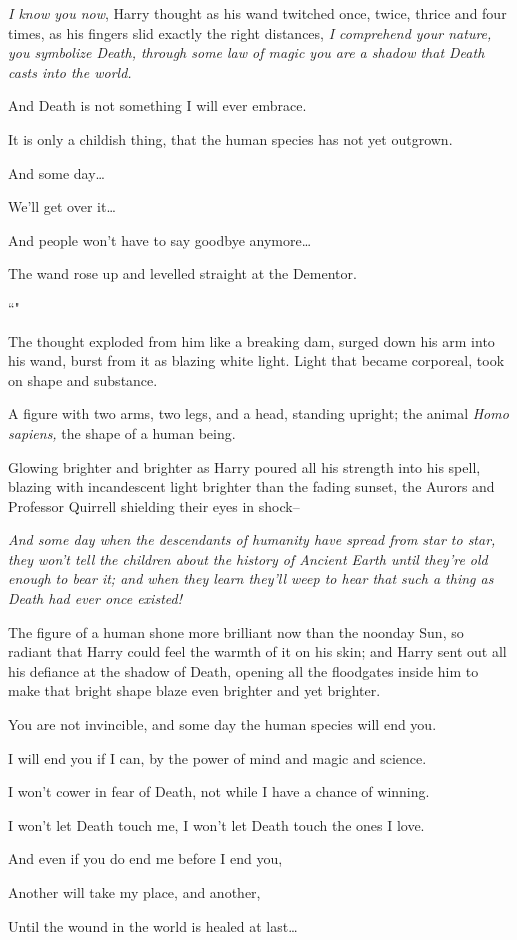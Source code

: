 \emph{I know you now}, Harry thought as his wand twitched once, twice, thrice and four times, as his fingers slid exactly the right distances, \emph{I comprehend your nature, you symbolize Death, through some law of magic you are a shadow that Death casts into the world.}

\begin{em}
And Death is not something I will ever embrace.

It is only a childish thing, that the human species has not yet outgrown.

And some day{\ldots}

We'll get over it{\ldots}

And people won't have to say goodbye anymore{\ldots}
\end{em}

The wand rose up and levelled straight at the Dementor.

``\emph{}"

The thought exploded from him like a breaking dam, surged down his arm into his wand, burst from it as blazing white light. Light that became corporeal, took on shape and substance.

A figure with two arms, two legs, and a head, standing upright; the animal \emph{Homo sapiens,} the shape of a human being.

Glowing brighter and brighter as Harry poured all his strength into his spell, blazing with incandescent light brighter than the fading sunset, the Aurors and Professor Quirrell shielding their eyes in shock\---

\emph{And some day when the descendants of humanity have spread from star to star, they won't tell the children about the history of Ancient Earth until they're old enough to bear it; and when they learn they'll weep to hear that such a thing as Death had ever once existed!}

The figure of a human shone more brilliant now than the noonday Sun, so radiant that Harry could feel the warmth of it on his skin; and Harry sent out all his defiance at the shadow of Death, opening all the floodgates inside him to make that bright shape blaze even brighter and yet brighter.

\begin{em}
You are not invincible, and some day the human species will end you.

I will end you if I can, by the power of mind and magic and science.

I won't cower in fear of Death, not while I have a chance of winning.

I won't let Death touch me, I won't let Death touch the ones I love.

And even if you do end me before I end you,

Another will take my place, and another,

Until the wound in the world is healed at last{\ldots}
\end{em}


